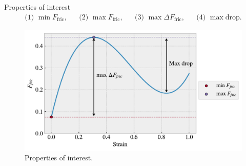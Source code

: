 \documentclass[
	10pt, %
]{beamer}
\begin{document}

%
%
\begin{frame}{Properties of interest}
	\begin{align*}
		&\text{(1) } \min F_{\text{fric}},& &\text{(2) } \max F_{\text{fric}},& &\text{(3) } \max \Delta F_{\text{fric}},& &\text{(4) } \max \text{drop}.&
	\end{align*}
	\begin{figure}[H]
		\centering
		\includegraphics[width=0.8\linewidth]{figures/prop_of_interets.pdf}
		\caption{Properties of interest.}
	\end{figure}
\end{frame}
%
%
\end{document}
